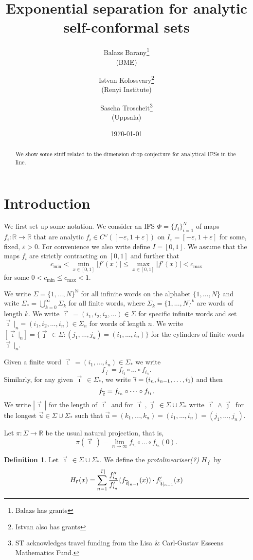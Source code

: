 \documentclass[12pt,]{article}
\title{Exponential separation for analytic self-conformal sets}
\author{Balazs Barany\footnote{Balazs has grants}\\(BME) \and Istvan Kolossvary\footnote{Istvan also
  has grants}\\ (Renyi Institute) \and Sascha
Troscheit\footnote{ST acknowledges travel funding from the Lisa \& Carl-Gustav Esseens Mathematics
Fund.} \\(Uppsala)}
\date{\today}
\theoremstyle{definition}
\newtheorem{definition}[theorem]{Definition}
\theoremstyle{remark}
\renewcommand{\Bbb}[1]{\mathbb{#1}}
\newcommand{\bbN}{{\Bbb N}}         %
\newcommand{\bbR}{{\Bbb R}}        %
\newcommand{\0}{\mathbf{0}}
\newcommand{\eps}{\varepsilon}
\newcommand{\cev}[1]{\reflectbox{\ensuremath{\vec{\reflectbox{\ensuremath{#1}}}}}}
\newcommand{\bi}{\vec{\imath}\,}
\newcommand{\bj}{\vec{\jmath}\,}
\newcommand{\bu}{{\vec{u}}}
\newcommand{\bbi}{\,\cev{\imath}}
\begin{document}
\frenchspacing
\maketitle

\begin{abstract}
  We show some stuff related to the dimension drop conjecture for analytical IFSs in the line.
\end{abstract}



%
%


\section{Introduction} \label{sec:intro}
We first set up some notation. We consider an IFS $\Phi=\{f_i\}_{i=1}^N$ of maps $f_i:\bbR\to\bbR$
that are analytic $f_i \in C^\omega([-\eps,1+\eps])$ on $I_{\eps}=[-\eps,1+\eps]$ for some, fixed, $\eps>0$.
For convenience we also write define $I=[0,1]$.
We assume that the maps $f_i$ are strictly contracting on $[0,1]$ and further that
\[
  c_{\min} < \min_{x\in[0,1]}
  |f'(x)| \leq \max_{x\in[0,1]}|f'(x)| < c_{\max}
\]
for some $0<c_{\min} \leq c_{\max}<1$.

We write $\Sigma = \{1,\dots, N\}^{\bbN}$ for all infinite words on the alphabet $\{1,\dots,N\}$ and
write $\Sigma_* = \bigcup_{k=0}^\infty \Sigma_k$ for all finite words, where $\Sigma_k =
\{1,\dots,N\}^k$ are words of length $k$.
We write $\bi=(i_1,i_2,i_3,\dots) \in\Sigma$ for specific infinite words and set $\bi|_n =
(i_1,i_2,\dots,i_n)\in \Sigma_n$ for words of length $n$. We write $[\bi|_n] = \{\bj\in\Sigma :
(j_1,\dots,j_n) = (i_1,\dots, i_n)\}$ for the cylinders of finite words $\bi|_n$.

Given a finite word $\bi=(i_1,\dots,i_n)\in\Sigma_*$ we write
\[
  f_{\bi} = f_{i_1}\circ \dots \circ f_{i_n}.
\]
Similarly, for any given $\bi\in\Sigma_*$, we write $\bbi = (i_n,i_{n-1},\dots, i_1)$ and then
\[
  f_{\bbi} = f_{i_n}\circ \dots \circ f_{i_1}.
\]
We write $|\bi|$ for the length of $\bi$ and for $\bi,\bj\in\Sigma\cup\Sigma_*$ write $\bi\wedge\bj$
for the longest $\bu\in\Sigma\cup\Sigma_*$ such that $\bu=(k_1,\dots, k_n) = (i_1,\dots,
i_n)=(j_1,\dots,j_n)$.

Let $\pi\colon\Sigma\to\bbR$ be the usual natural projection, that is,
\[
\pi(\bi)=\lim_{n\to\infty}f_{i_1}\circ \dots \circ f_{i_n}(0).
\]

\begin{definition}
  Let $\bi\in \Sigma\cup\Sigma_*$. We define the \emph{protolineariser(?)} $H_{\bi}$ by
  \[
    H_{\bi}(x) = \sum_{n=1}^{|\bi|}
  \frac{f''_{i_n}}{f'_{i_n}}(f_{\bbi|_{n-1}}(x))\cdot f'_{\bbi|_{n-1}}(x)
  \]
\end{definition}
\end{document}
